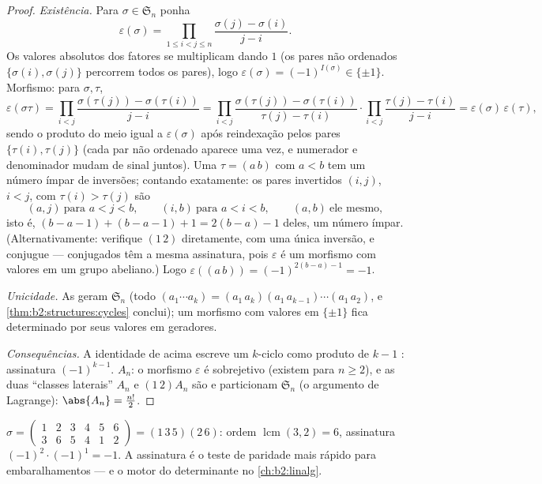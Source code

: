 \begin{proof}
\emph{Existência.} Para $\sigma \in \mathfrak{S}_n$ ponha
\[
\varepsilon(\sigma)
= \prod_{1 \leq i < j \leq n}
\frac{\sigma(j) - \sigma(i)}{j - i} .
\]
Os valores absolutos dos fatores se multiplicam dando $1$ (os pares não ordenados
$\{\sigma(i), \sigma(j)\}$ percorrem todos os pares), logo
$\varepsilon(\sigma) = (-1)^{I(\sigma)} \in \{\pm1\}$. Morfismo: para
$\sigma, \tau$,
\[
\varepsilon(\sigma\tau)
= \prod_{i<j} \frac{\sigma(\tau(j)) - \sigma(\tau(i))}{j - i}
= \prod_{i<j} \frac{\sigma(\tau(j)) - \sigma(\tau(i))}{\tau(j) -
\tau(i)} \cdot \prod_{i<j} \frac{\tau(j) - \tau(i)}{j - i}
= \varepsilon(\sigma)\,\varepsilon(\tau),
\]
sendo o produto do meio igual a $\varepsilon(\sigma)$ após reindexação
pelos pares $\{\tau(i), \tau(j)\}$ (cada par não ordenado aparece uma vez,
e numerador e denominador mudam de sinal juntos). Uma 
$\tau = (a\,b)$ com $a < b$ tem um número ímpar de inversões;
contando exatamente: os pares invertidos $(i, j)$, $i < j$, com
$\tau(i) > \tau(j)$ são
\[
(a, j) \ \text{para } a < j < b, \qquad
(i, b) \ \text{para } a < i < b, \qquad
(a, b) \ \text{ele mesmo},
\]
isto é, $(b - a - 1) + (b - a - 1) + 1 = 2(b - a) - 1$ deles,
um número ímpar. (Alternativamente: verifique $(1\,2)$ diretamente, com uma única
inversão, e conjugue --- conjugados têm a mesma assinatura,
pois $\varepsilon$ é um morfismo com valores em um grupo abeliano.) Logo
$\varepsilon((a\,b)) = (-1)^{2(b-a)-1} = -1$.

\emph{Unicidade.} As  geram $\mathfrak{S}_n$ (todo
 $(a_1\cdots a_k) = (a_1\,a_k)(a_1\,a_{k-1})\cdots(a_1\,a_2)$,
e \cref{thm:b2:structures:cycles} conclui); um morfismo com valores em
$\{\pm1\}$ fica determinado por seus valores em geradores.

\emph{Consequências.} A identidade de  acima escreve um $k$-ciclo como
produto de $k - 1$ : assinatura $(-1)^{k-1}$. $A_n$: o morfismo
$\varepsilon$ é sobrejetivo (existem  para $n \geq 2$),
e as duas ``classes laterais'' $A_n$ e $(1\,2)A_n$ são  e
particionam $\mathfrak{S}_n$ (o argumento de Lagrange): $\abs{A_n} =
\frac{n!}{2}$.
\end{proof}

\begin{example}\label{ex:b2:structures:snexample}
$\sigma = \begin{pmatrix} 1&2&3&4&5&6\\ 3&6&5&4&1&2 \end{pmatrix}
= (1\,3\,5)(2\,6)$: ordem $\operatorname{lcm}(3,2) = 6$, assinatura
$(-1)^{2}\cdot(-1)^{1} = -1$. A assinatura é o teste de paridade mais rápido
para embaralhamentos --- e o motor do determinante no
\cref{ch:b2:linalg}.
\end{example}


